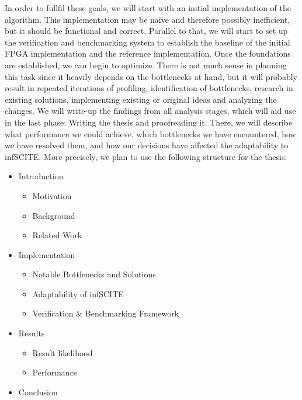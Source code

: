 In order to fullfil these goals, we will start with an initial implementation of the algorithm. This implementation may be naive and therefore possibly inefficient, but it should be functional and correct. Parallel to that, we will start to set up the verification and benchmarking system to establish the baseline of the initial FPGA implementation and the reference implementation. Once the foundations are established, we can begin to optimize. There is not much sense in planning this task since it heavily depends on the bottlenecks at hand, but it will probably result in repeated iterations of profiling, identification of bottlenecks, research in existing solutions, implementing existing or original ideas and analyzing the changes. We will write-up the findings from all analysis stages, which will aid use in the last phase: Writing the thesis and proofreading it. There, we will describe what performance we could achieve, which bottlenecks we have encountered, how we have resolved them, and how our decisions have affected the adaptability to \ac{infSCITE}. More precisely, we plan to use the following structure for the thesis:

\begin{itemize}
    \item Introduction
    \begin{itemize}
        \item Motivation
        \item Background
        \item Related Work
    \end{itemize}
    \item Implementation
    \begin{itemize}
        \item Notable Bottlenecks and Solutions
        \item Adaptability of \ac{infSCITE}
        \item Verification \& Benchmarking Framework
    \end{itemize}
    \item Results
    \begin{itemize}
        \item Result likelihood
        \item Performance
    \end{itemize}
    \item Conclusion
\end{itemize}

